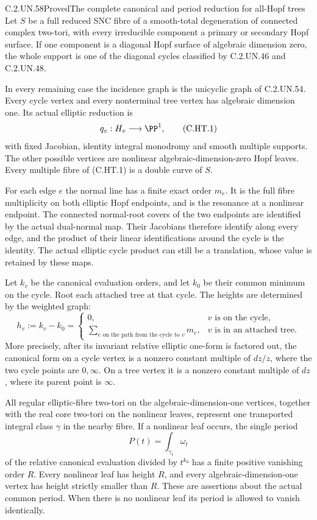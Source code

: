 \begin{statement}{C.2.UN.58}{Proved}{The complete canonical and period reduction for all-Hopf trees}
Let $S$ be a full reduced SNC fibre of a smooth-total degeneration
of connected complex two-tori, with every irreducible component a
primary or secondary Hopf surface. If one component is a diagonal
Hopf surface of algebraic dimension zero, the whole support is
one of the diagonal cycles classified by C.2.UN.46 and C.2.UN.48.

In every remaining case the incidence graph is the unicyclic graph
of C.2.UN.54. Every cycle vertex and every nonterminal tree vertex
has algebraic dimension one. Its actual elliptic reduction is
\[
                    q_v:H_v\longrightarrow\PP^1,        \tag{C.HT.1}
\]
with fixed Jacobian, identity integral monodromy and smooth multiple
supports. The other possible vertices are nonlinear
algebraic-dimension-zero Hopf leaves. Every multiple fibre of
(C.HT.1) is a double curve of $S$.

For each edge $e$ the normal line has a finite exact order $m_e$.
It is the full fibre multiplicity on both elliptic Hopf endpoints,
and is the resonance at a nonlinear endpoint. The connected
normal-root covers of the two endpoints are identified by the
actual dual-normal map. Their Jacobians therefore identify along
every edge, and the product of their linear identifications around
the cycle is the identity. The actual elliptic cycle product can
still be a translation, whose value is retained by these maps.

Let $k_v$ be the canonical evaluation orders, and let $k_0$ be their
common minimum on the cycle. Root each attached tree at that cycle.
The heights are determined by the weighted graph:
\[
 h_v:=k_v-k_0=
 \begin{cases}
 0,&v\text{ is on the cycle},\\
 \displaystyle\sum_{e\text{ on the path from the cycle to }v}m_e,
       &v\text{ is in an attached tree}.
 \end{cases}                                           \tag{C.HT.2}
\]
More precisely, after its invariant relative elliptic one-form is
factored out, the canonical form on a cycle vertex is a nonzero
constant multiple of $dz/z$, where the two cycle points are
$0,\infty$. On a tree vertex it is a nonzero constant multiple of
$dz$, where its parent point is $\infty$.

All regular elliptic-fibre two-tori on the algebraic-dimension-one
vertices, together with the real core two-tori on the nonlinear
leaves, represent one transported integral class $\gamma$ in the
nearby fibre. If a nonlinear leaf occurs, the single period
\[
                     P(t)=\int_{\gamma_t}\omega_t       \tag{C.HT.3}
\]
of the relative canonical evaluation divided by $t^{k_0}$ has a
finite positive vanishing order $R$. Every nonlinear leaf has
height $R$, and every algebraic-dimension-one vertex has height
strictly smaller than $R$. These are assertions about the actual
common period. When there is no nonlinear leaf its period is
allowed to vanish identically.
\end{statement}

